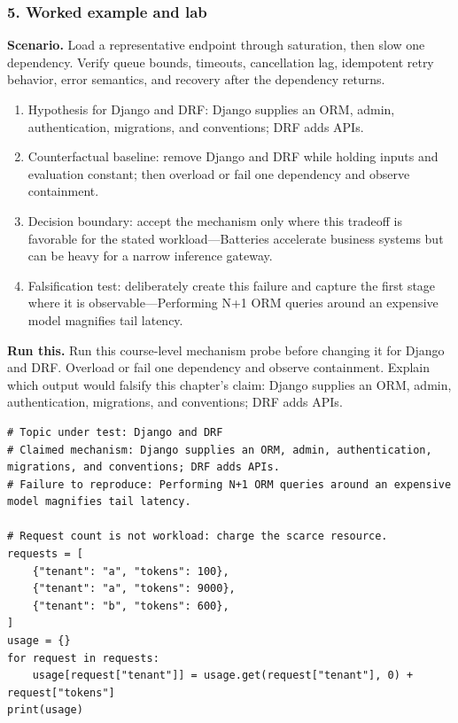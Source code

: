 \subsubsection*{5. Worked example and lab}
\textbf{Scenario.} Load a representative endpoint through saturation, then slow one dependency. Verify queue bounds, timeouts, cancellation lag, idempotent retry behavior, error semantics, and recovery after the dependency returns.
\begin{enumerate}
\item Hypothesis for Django and DRF: Django supplies an ORM, admin, authentication, migrations, and conventions; DRF adds APIs.
\item Counterfactual baseline: remove Django and DRF while holding inputs and evaluation constant; then overload or fail one dependency and observe containment.
\item Decision boundary: accept the mechanism only where this tradeoff is favorable for the stated workload—Batteries accelerate business systems but can be heavy for a narrow inference gateway.
\item Falsification test: deliberately create this failure and capture the first stage where it is observable—Performing N+1 ORM queries around an expensive model magnifies tail latency.
\end{enumerate}
\textbf{Run this.} Run this course-level mechanism probe before changing it for Django and DRF. Overload or fail one dependency and observe containment. Explain which output would falsify this chapter's claim: Django supplies an ORM, admin, authentication, migrations, and conventions; DRF adds APIs.
\begin{Verbatim}[fontsize=\scriptsize]
# Topic under test: Django and DRF
# Claimed mechanism: Django supplies an ORM, admin, authentication, migrations, and conventions; DRF adds APIs.
# Failure to reproduce: Performing N+1 ORM queries around an expensive model magnifies tail latency.

# Request count is not workload: charge the scarce resource.
requests = [
    {"tenant": "a", "tokens": 100},
    {"tenant": "a", "tokens": 9000},
    {"tenant": "b", "tokens": 600},
]
usage = {}
for request in requests:
    usage[request["tenant"]] = usage.get(request["tenant"], 0) + request["tokens"]
print(usage)
\end{Verbatim}
